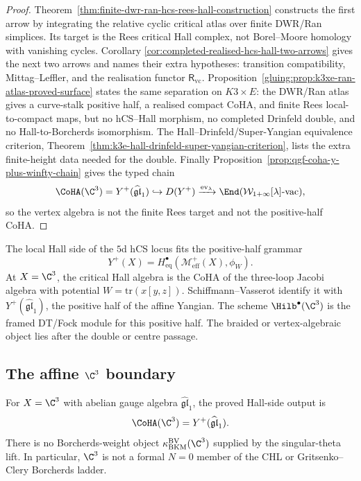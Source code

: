 \begin{proof}
Theorem~\ref{thm:finite-dwr-ran-hcs-rees-hall-construction} constructs
the first arrow by integrating the relative cyclic critical atlas over
finite DWR/Ran simplices. Its target is the Rees critical Hall complex,
not Borel--Moore homology with vanishing cycles. Corollary
\ref{cor:completed-realised-hcs-hall-two-arrows} gives the next two
arrows and names their extra hypotheses: transition compatibility,
Mittag--Leffler, and the realisation functor \(\mathsf R_{\mathrm{vc}}\).
Proposition~\ref{gluing:prop:k3xe-ran-atlas-proved-surface} states the
same separation on \(K3\times E\): the DWR/Ran atlas gives a
curve-stalk positive half, a realised compact CoHA, and finite Rees
local-to-compact maps, but no hCS--Hall morphism, no completed
Drinfeld double, and no Hall-to-Borcherds isomorphism. The
Hall--Drinfeld/Super-Yangian equivalence criterion,
Theorem~\ref{thm:k3e-hall-drinfeld-super-yangian-criterion}, lists the
extra finite-height data needed for the double. Finally
Proposition~\ref{prop:qgf-coha-y-plus-winfty-chain} gives the typed
chain
\[
 \CoHA(\C^3)=Y^+(\widehat{\mathfrak{gl}}_1)
 \hookrightarrow D(Y^+)
 \xrightarrow{\mathrm{ev}_\lambda}
 \End(\mathcal W_{1+\infty}[\lambda]\text{-}\mathrm{vac}),
\]
so the vertex algebra is not the finite Rees target and not the
positive-half CoHA.
\end{proof}

\begin{remark}
\label{rem:phiutp-positive-geometry-5d-hcs}
The local Hall side of the \(5\)d hCS locus fits the positive-half
grammar
\[
Y^+(X)=H^\bullet_{\mathrm{eq}}(\mathcal M^+_{\mathrm{eff}}(X),\phi_W).
\]
At \(X=\C^3\), the critical Hall algebra is the CoHA of the three-loop
Jacobi algebra with potential \(W=\mathrm{tr}(x[y,z])\). Schiffmann--Vasserot
identify it with \(Y^+(\widehat{\mathfrak{gl}}_1)\), the positive half
of the affine Yangian. The scheme \(\Hilb^\bullet(\C^3)\) is the framed
DT/Fock module for this positive half. The braided or vertex-algebraic
object lies after the double or centre passage.
\end{remark}

\subsection{The affine \texorpdfstring{$\C^3$}{C3} boundary}
\label{subsec:phiutp-bv-c3-base-case}

\begin{proposition}
\label{prop:phiutp-c3-positive-half-no-borcherds-residue}
For \(X=\C^3\) with abelian gauge algebra
\(\widehat{\mathfrak{gl}}_1\), the proved Hall-side output is
\[
 \CoHA(\C^3)=Y^+(\widehat{\mathfrak{gl}}_1).
\]
There is no Borcherds-weight object
\(\kappa_{\mathrm{BKM}}^{\mathrm{BV}}(\C^3)\) supplied by the
singular-theta lift. In particular, \(\C^3\) is not a formal
\(N=0\) member of the CHL or Gritsenko--Clery Borcherds ladder.
\end{proposition}


